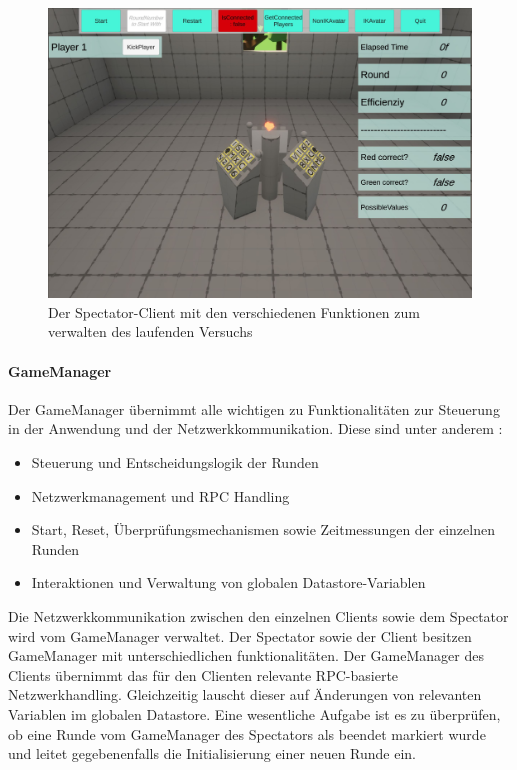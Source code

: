 \documentclass[a4paper,11pt]{article}%
\renewcommand{\\}{\vspace*{0.5\baselineskip} \newline}
\begin{document}
\begin{figure}[H]
		\begin{footnotesize}
		\centering
			\includegraphics[scale=0.3]{Abbildungen/Versuchsumgebung/SpectatorView.JPG}
			
			\caption[Abbildung 1]{Der Spectator-Client mit den verschiedenen Funktionen zum verwalten des laufenden Versuchs}
			\label{SpectatorView}
		\end{footnotesize}
	\end{figure}
	
\paragraph{GameManager}
Der GameManager übernimmt alle wichtigen zu Funktionalitäten zur Steuerung in der Anwendung und der Netzwerkkommunikation.
Diese sind unter anderem :
\begin{itemize}[itemsep=0cm]
\item Steuerung und Entscheidungslogik der Runden
\item Netzwerkmanagement und RPC Handling
\item Start, Reset, Überprüfungsmechanismen sowie Zeitmessungen der einzelnen Runden
\item Interaktionen und Verwaltung von globalen Datastore-Variablen
\end{itemize}

Die Netzwerkkommunikation zwischen den einzelnen Clients sowie dem Spectator wird vom GameManager verwaltet. Der Spectator sowie der Client besitzen GameManager mit unterschiedlichen funktionalitäten.
Der GameManager des Clients übernimmt das für den Clienten relevante RPC-basierte Netzwerkhandling. Gleichzeitig lauscht dieser auf Änderungen von relevanten Variablen im globalen Datastore.
Eine wesentliche Aufgabe ist es zu überprüfen, ob eine Runde vom GameManager des Spectators als beendet markiert wurde und leitet gegebenenfalls die Initialisierung einer neuen Runde ein.
\end{document}
